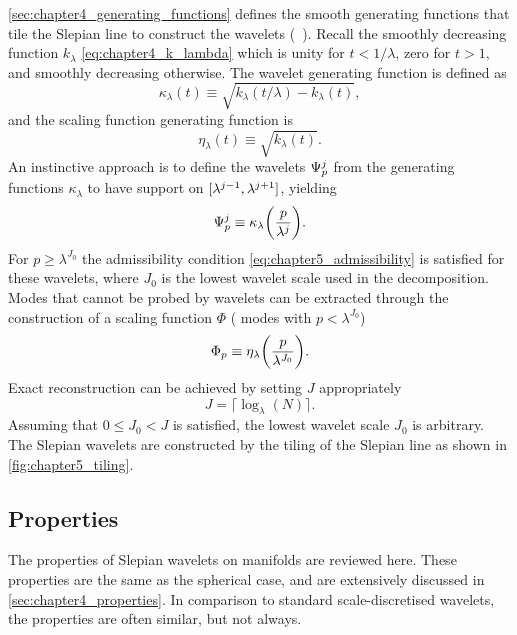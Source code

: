 \cref{sec:chapter4_generating_functions} defines the smooth generating functions that tile the Slepian line to construct the wavelets (\cf{}~\cite{Wiaux2008}).
Recall the smoothly decreasing function \(k_{\lambda}\) \cref{eq:chapter4_k_lambda} which is unity for \(t < 1/\lambda{}\), zero for \(t > 1\), and smoothly decreasing otherwise.
The wavelet generating function is defined as
%
\begin{equation}
	\kappa_{\lambda}(t)
	\equiv \sqrt{k_{\lambda}(t/\lambda) - k_{\lambda}(t)},
\end{equation}
%
and the scaling function generating function is
%
\begin{equation}
	\eta_{\lambda}(t)
	\equiv \sqrt{k_{\lambda}(t)}.
\end{equation}
%
An instinctive approach is to define the wavelets \({\Psi}_{p}^{j}\) from the generating functions \(\kappa_{\lambda}\) to have support on \(\interval{\lambda^{j-1}}{\lambda^{j+1}}\), yielding
%
\begin{equation}
	{\Psi}_{p}^{j}
	\equiv \kappa_{\lambda}\bigg(\frac{p}{\lambda^{j}}\bigg).
\end{equation}
%
For \(p \geq \lambda^{J_{0}}\) the admissibility condition \cref{eq:chapter5_admissibility} is satisfied for these wavelets, where \(J_{0}\) is the lowest wavelet scale used in the decomposition.
Modes that cannot be probed by wavelets can be extracted through the construction of a scaling function \(\Phi{}\) (\ie{} modes with \(p < \lambda^{J_{0}}\))
%
\begin{equation}
	{\Phi}_{p}
	\equiv \eta_{\lambda}\bigg(\frac{p}{\lambda^{J_{0}}}\bigg).
\end{equation}
%
Exact reconstruction can be achieved by setting \(J\) appropriately
%
\begin{equation}
	J = \lceil{} \log_{\lambda}(N)\rceil{}.
\end{equation}
%
Assuming that \(0 \leq J_{0} < J\) is satisfied, the lowest wavelet scale \(J_{0}\) is arbitrary.
The Slepian wavelets are constructed by the tiling of the Slepian line as shown in \cref{fig:chapter5_tiling}.



\subsection{Properties}\label{sec:chapter5_properties}

The properties of Slepian wavelets on manifolds are reviewed here.
These properties are the same as the spherical case, and are extensively discussed in \cref{sec:chapter4_properties}.
In comparison to standard scale-discretised wavelets, the properties are often similar, but not always.

